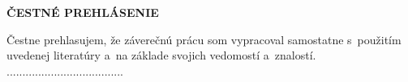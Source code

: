 \newpage
\thispagestyle{plain}
\vspace*{19cm}
\begin{large}
\noindent
\textbf{ČESTNÉ PREHLÁSENIE} \\
\end{large}
\noindent
Čestne prehlasujem, že záverečnú prácu som vypracoval samostatne s~použitím uvedenej literatúry a~na základe svojich
vedomostí a~znalostí.
\vspace*{1.5cm}\\
\hspace*{11cm}.....................................\\
\hspace*{11.5cm} \Author
\afterpage{\blankpage}
